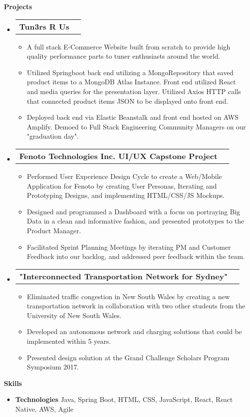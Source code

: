 \documentclass[letterpaper,12pt]{article}[leftmargin=*]
\makeatletter
\def \entryspacing {-0pt}
\renewcommand{\section}[2]{\vspace{5pt}
  \colorbox{secondary}{\color{white}\raggedbottom\normalsize\textbf{{#1}{\hspace{7pt}#2}}}
}
\newcommand{\resumeEntryStart}{\begin{itemize}[leftmargin=2.5mm]}
\newcommand{\resumeEntryEnd}{\end{itemize}\vspace{\entryspacing}}
\newcommand{\resumeItemListStart}{\begin{itemize}[leftmargin=4.5mm]}
\newcommand{\resumeItemListEnd}{\end{itemize}}
\newcommand{\resumeItem}[1]{
  \item\small{
    {#1 \vspace{-2pt}}
  }
}
\newcommand{\resumeEntryTD}[2]{
  \vspace{-1pt}\item[]
    \begin{tabularx}{0.97\textwidth}{X@{\hspace{60pt}}r}
      \textbf{\color{primary}#1} & {\firabook\color{accent}\small#2} \\
    \end{tabularx}\vspace{-6pt}
}
\newcommand{\resumeEntryS}[2]{
  \item[]\small{
    \textbf{\color{primary}#1 }{ #2 \vspace{-6pt}}
  }
}
\makeatother
\begin{document}
\section{\faFlask}{Projects}

 \resumeEntryStart
    \resumeEntryTD
      {Tun3rs R Us}{}
    \resumeItemListStart
      \resumeItem {A full stack E-Commerce Website built from scratch to provide high quality performance parts to tuner enthusiasts around the world.}
      \resumeItem {Utilized Springboot back end utilizing a MongoRepository that saved product items to a MongoDB Atlas Instance. Front end utilized React and media queries for the presentation layer. Utilized Axios HTTP calls that connected product items JSON to be displayed onto front end.}
        \resumeItem {Deployed back end via Elastic Beanstalk and front end hosted on AWS Amplify. Demoed to Full Stack Engineering Community Managers on our "graduation day".}
    \resumeItemListEnd
  \resumeEntryEnd


  \resumeEntryStart
    \resumeEntryTD
      {Fenoto Technologies Inc. UI/UX Capstone Project}{}

    \resumeItemListStart
        \resumeItem {Performed User Experience Design Cycle to create a Web/Mobile Application for Fenoto by creating User Personas, Iterating and Prototyping Designs, and implementing HTML/CSS/JS Mockups.}
        \resumeItem {Designed and programmed a Dashboard with a focus on portraying Big Data in a clean and informative fashion, and presented prototypes to the Product Manager.}
        \resumeItem {Facilitated Sprint Planning Meetings by iterating PM and Customer Feedback into our backlog, and addressed peer feedback within the team. }
    \resumeItemListEnd
  \resumeEntryEnd
  

  \resumeEntryStart
    \resumeEntryTD
      {"Interconnected Transportation Network for Sydney"}{}
    \resumeItemListStart
      \resumeItem {Eliminated traffic congestion in New South Wales by creating a new transportation network in collaboration with two other students from the University of New South Wales.}
            \resumeItem {Developed an autonomous network and charging solutions that could be implemented within 5 years.}
                  \resumeItem {Presented design solution at the Grand Challenge Scholars Program Symposium 2017.}
    \resumeItemListEnd
  \resumeEntryEnd
  
\section{\faGears}{Skills}
 \resumeEntryStart
  \resumeEntryS{Technologies } {Java, Spring Boot, HTML, CSS, JavaScript, React, React Native, AWS, Agile}
 \resumeEntryEnd
\end{document}
